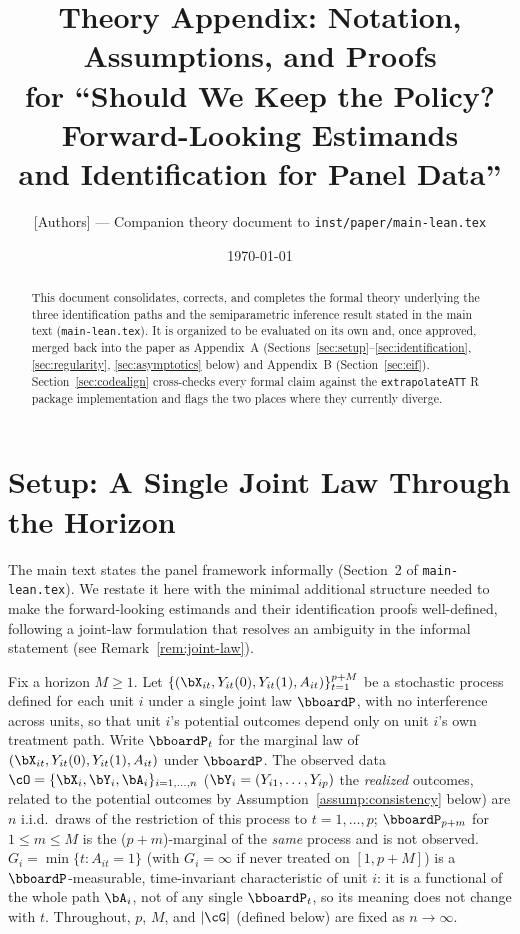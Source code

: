 \documentclass{article}
\title{Theory Appendix: Notation, Assumptions, and Proofs \\ \large for ``Should We Keep the Policy? Forward-Looking Estimands \\ and Identification for Panel Data''}
\author{[Authors] --- Companion theory document to \texttt{inst/paper/main-lean.tex}}
\date{\today}
\renewcommand{\P}{\bboardP}
\begin{document}
\maketitle

\begin{abstract}
This document consolidates, corrects, and completes the formal theory underlying the three identification paths and the semiparametric inference result stated in the main text (\texttt{main-lean.tex}). It is organized to be evaluated on its own and, once approved, merged back into the paper as Appendix~A (Sections~\ref{sec:setup}--\ref{sec:identification}, \ref{sec:regularity}, \ref{sec:asymptotics} below) and Appendix~B (Section~\ref{sec:eif}). Section~\ref{sec:codealign} cross-checks every formal claim against the \texttt{extrapolateATT} R package implementation and flags the two places where they currently diverge.
\end{abstract}

\tableofcontents

\section{Setup: A Single Joint Law Through the Horizon}
\label{sec:setup}

The main text states the panel framework informally (Section~2 of \texttt{main-lean.tex}). We restate it here with the minimal additional structure needed to make the forward-looking estimands and their identification proofs well-defined, following a joint-law formulation that resolves an ambiguity in the informal statement (see Remark~\ref{rem:joint-law}).

\begin{definition}
\label{def:dgp}
Fix a horizon $M \geq 1$. Let $\{(\bX_{it}, Y_{it}(0), Y_{it}(1), A_{it})\}_{t=1}^{p+M}$ be a stochastic process defined for each unit $i$ under a single joint law $\P$, with no interference across units, so that unit $i$'s potential outcomes depend only on unit $i$'s own treatment path. Write $\P_t$ for the marginal law of $(\bX_{it}, Y_{it}(0), Y_{it}(1), A_{it})$ under $\P$. The observed data $\cO = \{\bX_i, \bY_i, \bA_i\}_{i=1,\ldots,n}$ ($\bY_i = (Y_{i1},\ldots,Y_{ip})$ the \emph{realized} outcomes, related to the potential outcomes by Assumption~\ref{assump:consistency} below) are $n$ i.i.d.\ draws of the restriction of this process to $t = 1, \ldots, p$; $\P_{p+m}$ for $1 \leq m \leq M$ is the ($p{+}m$)-marginal of the \emph{same} process and is not observed. $G_i = \min\{t : A_{it}=1\}$ (with $G_i = \infty$ if never treated on $[1,p+M]$) is a $\P$-measurable, time-invariant characteristic of unit $i$: it is a functional of the whole path $\bA_i$, not of any single $\P_t$, so its meaning does not change with $t$. Throughout, $p$, $M$, and $|\cG|$ (defined below) are fixed as $n\to\infty$.
\end{definition}
\end{document}
